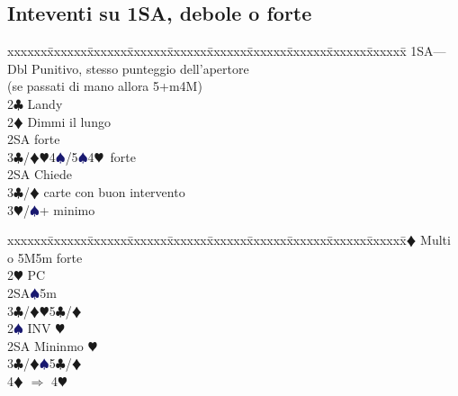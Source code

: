 \documentclass[a4paper,italian]{article}
\newcommand{\BC}{\textcolor{OliveGreen}{$\clubsuit$}}
\newcommand{\BD}{\textcolor{RedOrange}{$\vardiamondsuit$}}
\newcommand{\BH}{\textcolor{Red2}{$\varheartsuit${}}}
\newcommand{\BS}{\textcolor{MidnightBlue}{$\spadesuit${}}}
\newenvironment{bidtable}
{\begin{tabbing}

    xxxxxx\=xxxxxx\=xxxxxx\=xxxxxx\=xxxxxx\=xxxxxx\=xxxxxx\=xxxxxx\=xxxxxx\=xxxxxx\=\kill}
{\end{tabbing} }%
\begin{document}
\begin{multicols}{2}
                                        \subsection{Inteventi su 1SA, debole o forte}
                                        \begin{bidtable}
                                            1SA---\\
                                            Dbl \> Punitivo, stesso punteggio dell'apertore\+\\(se passati di mano allora 5+m4M)\-\\
                                            2\BC \> Landy\+\\
                                                2\BD\> Dimmi il lungo\+\\
                                                    2SA forte\\
                                                    3\BC/\BD{}\BH4\BS/5\BS4\BH\ forte\-\\
                                                2SA \> Chiede\+\\
                                                    3\BC/\BD{} carte con buon intervento\\
                                                    3\BH/\BS{}+ minimo\-\-\\
                                        \end{bidtable}
                                        \columnbreak
                                        \begin{bidtable}
                                            2\BD\> Multi o 5M5m forte\+\\
                                                2\BH\> PC\+\\
                                                    2SA\BS5m\\
                                                    3\BC/\BD{}\BH5\BC/\BD\-\\
                                                2\BS\> INV \BH\+\\
                                                    2SA\> Mininmo \BH\\
                                                    3\BC/\BD{}\BS5\BC/\BD\\
                                                    4\BD\> $\Rightarrow$ 4\BH\-\\

\end{bidtable}
\end{multicols}
\end{document}
